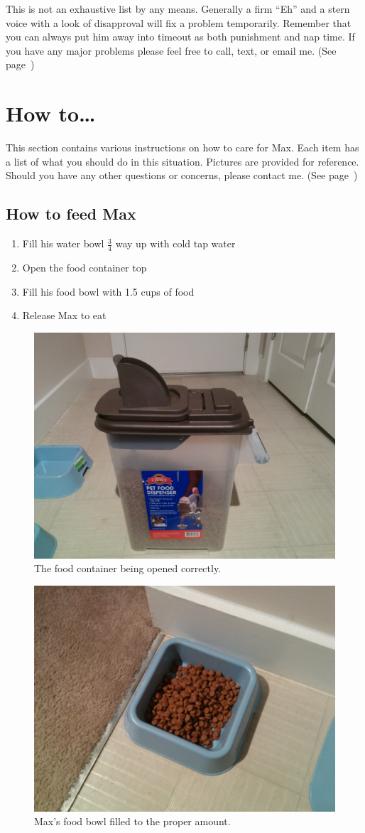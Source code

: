 \documentclass[pdftex,12pt]{article}
\begin{document}
\bigskip

This is not an exhaustive list by any means.
Generally a firm ``Eh'' and a stern voice with a look of disapproval will fix a problem temporarily.
Remember that you can always put him away into timeout as both punishment and nap time.
If you have any major problems please feel free to call, text, or email me.
(See page~\pageref{tab:information})

\newpage
\section{How to\ldots}

This section contains various instructions on how to care for Max.
Each item has a list of what you should do in this situation.
Pictures are provided for reference.
Should you have any other questions or concerns, please contact me.
(See page~\pageref{tab:information})

\subsection{How to feed Max}
\begin{enumerate}\label{itm:how_to_feed}
    \item Fill his water bowl $\frac{3}{4}$ way up with cold tap water
    \item Open the food container top
    \item Fill his food bowl with 1.5 cups of food
    \item Release Max to eat
\end{enumerate}

\bigskip

\begin{figure}[h!]
    \centering
    \includegraphics[width=.35\textwidth]{./images/how_to/feed_max/food_container_open.jpg}
    \caption*{The food container being opened correctly.}
    \label{fig:food_container_open}
\end{figure}

\bigskip

\begin{figure}[h!]
    \centering
    \includegraphics[width=.35\textwidth]{./images/how_to/feed_max/food_bowl_filled.jpg}
    \caption*{Max's food bowl filled to the proper amount.}
    \label{fig:food_bowl_filled}
\end{figure}
\end{document}
